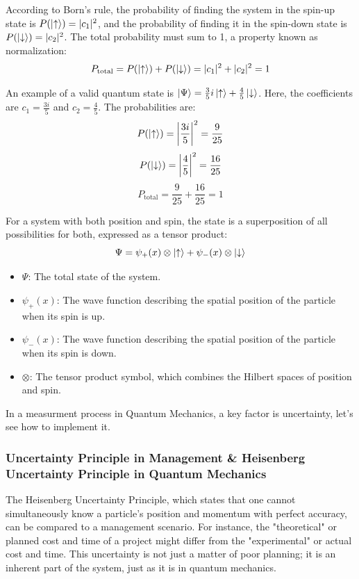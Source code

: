 \documentclass{article}
\begin{document}
 According to Born's rule, the probability of finding the system in the spin-up state is $P(\ket{\uparrow}) = |c_1|^2$, and the probability of finding it in the spin-down state is $P(\ket{\downarrow}) = |c_2|^2$. The total probability must sum to 1, a property known as normalization:
 $$ P_{\text{total}} = P(\ket{\uparrow}) + P(\ket{\downarrow}) = |c_1|^2 + |c_2|^2 = 1 $$
 
 An example of a valid quantum state is $\ket{\Psi} = \frac{3}{5}i \ket{\uparrow} + \frac{4}{5} \ket{\downarrow}$. Here, the coefficients are $c_1 = \frac{3i}{5}$ and $c_2 = \frac{4}{5}$.
 The probabilities are:
 $$ P(\ket{\uparrow}) = \left|\frac{3i}{5}\right|^2 = \frac{9}{25} $$
 $$ P(\ket{\downarrow}) = \left|\frac{4}{5}\right|^2 = \frac{16}{25} $$
 $$ P_{\text{total}} = \frac{9}{25} + \frac{16}{25} = 1 $$
 
 For a system with both position and spin, the state is a superposition of all possibilities for both, expressed as a tensor product:
 $$ \Psi = \psi_+(x) \otimes \ket{\uparrow} + \psi_-(x) \otimes \ket{\downarrow} $$
 \begin{itemize}
 	\item $\Psi$: The total state of the system.
 	\item $\psi_+(x)$: The wave function describing the spatial position of the particle when its spin is up.
 	\item $\psi_-(x)$: The wave function describing the spatial position of the particle when its spin is down.
 	\item $\otimes$: The tensor product symbol, which combines the Hilbert spaces of position and spin.
 \end{itemize}

 In a measurment process in Quantum Mechanics, a key factor is uncertainty, let's see how to implement it.
 \newpage
 \subsubsection*{Uncertainty Principle in Management \& Heisenberg Uncertainty Principle in Quantum Mechanics}
The Heisenberg Uncertainty Principle, which states that one cannot simultaneously know a particle's position and momentum with perfect accuracy, can be compared to a management scenario. For instance, the "theoretical" or planned cost and time of a project might differ from the "experimental" or actual cost and time. This uncertainty is not just a matter of poor planning; it is an inherent part of the system, just as it is in quantum mechanics.
 
\end{document}
